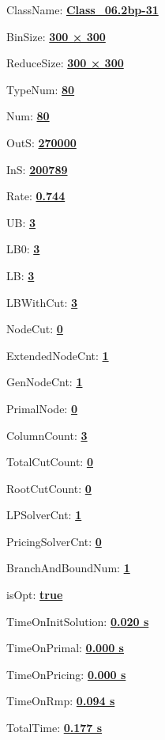 \documentclass[11pt]{article}
\begin{document}
\pagestyle{empty}


ClassName: \underline{\textbf{Class_06.2bp-31}}
\par
BinSize: \underline{\textbf{300 × 300}}
\par
ReduceSize: \underline{\textbf{300 × 300}}
\par
TypeNum: \underline{\textbf{80}}
\par
Num: \underline{\textbf{80}}
\par
OutS: \underline{\textbf{270000}}
\par
InS: \underline{\textbf{200789}}
\par
Rate: \underline{\textbf{0.744}}
\par
UB: \underline{\textbf{3}}
\par
LB0: \underline{\textbf{3}}
\par
LB: \underline{\textbf{3}}
\par
LBWithCut: \underline{\textbf{3}}
\par
NodeCut: \underline{\textbf{0}}
\par
ExtendedNodeCnt: \underline{\textbf{1}}
\par
GenNodeCnt: \underline{\textbf{1}}
\par
PrimalNode: \underline{\textbf{0}}
\par
ColumnCount: \underline{\textbf{3}}
\par
TotalCutCount: \underline{\textbf{0}}
\par
RootCutCount: \underline{\textbf{0}}
\par
LPSolverCnt: \underline{\textbf{1}}
\par
PricingSolverCnt: \underline{\textbf{0}}
\par
BranchAndBoundNum: \underline{\textbf{1}}
\par
isOpt: \underline{\textbf{true}}
\par
TimeOnInitSolution: \underline{\textbf{0.020 s}}
\par
TimeOnPrimal: \underline{\textbf{0.000 s}}
\par
TimeOnPricing: \underline{\textbf{0.000 s}}
\par
TimeOnRmp: \underline{\textbf{0.094 s}}
\par
TotalTime: \underline{\textbf{0.177 s}}
\par
\newpage
\end{document}
